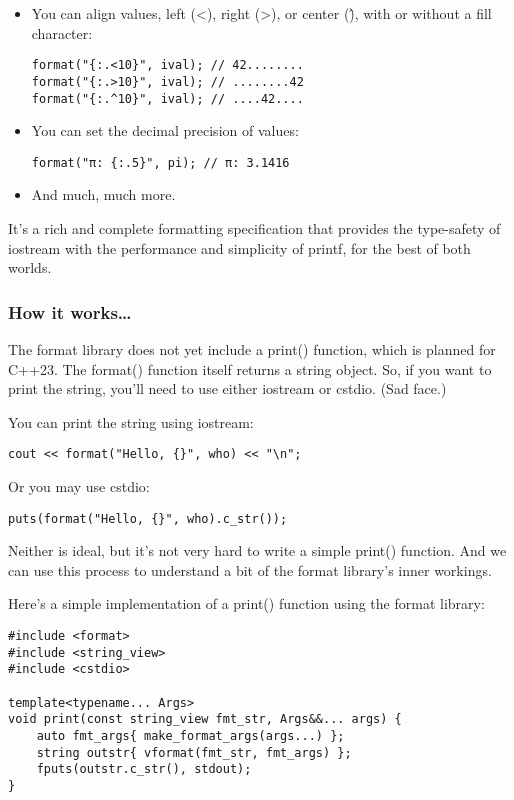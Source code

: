 \begin{itemize}
\item 
You can align values, left (<), right (>), or center (\^), with or without a fill character:

\begin{lstlisting}[style=styleCXX]
format("{:.<10}", ival); // 42........
format("{:.>10}", ival); // ........42
format("{:.^10}", ival); // ....42....
\end{lstlisting}

\item 
You can set the decimal precision of values:

\begin{lstlisting}[style=styleCXX]
format("π: {:.5}", pi); // π: 3.1416
\end{lstlisting}

\item 
And much, much more.
\end{itemize}

It's a rich and complete formatting specification that provides the type-safety of iostream with the performance and simplicity of printf, for the best of both worlds.

\subsubsection{How it works…}

The format library does not yet include a print() function, which is planned for C++23. The format() function itself returns a string object. So, if you want to print the string, you'll need to use either iostream or cstdio. (Sad face.) 

You can print the string using iostream:

\begin{lstlisting}[style=styleCXX]
cout << format("Hello, {}", who) << "\n";
\end{lstlisting}

Or you may use cstdio:

\begin{lstlisting}[style=styleCXX]
puts(format("Hello, {}", who).c_str());
\end{lstlisting}

Neither is ideal, but it's not very hard to write a simple print() function. And we can use this process to understand a bit of the format library's inner workings.

Here's a simple implementation of a print() function using the format library:

\begin{lstlisting}[style=styleCXX]
#include <format>
#include <string_view>
#include <cstdio>

template<typename... Args>
void print(const string_view fmt_str, Args&&... args) {
	auto fmt_args{ make_format_args(args...) };
	string outstr{ vformat(fmt_str, fmt_args) };
	fputs(outstr.c_str(), stdout);
}
\end{lstlisting}

